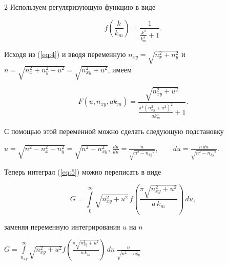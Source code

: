 \documentclass[twoside, 10pt]{article}
\def\myvspacebeforesubsection{-2.0mm}
\def\myvspaceaftersubsection{-2.5mm}
\begin{document}
\vspace{\myvspacebeforesubsection}
    \subsection*{}\label{appendix-a.-integration-details}
\vspace{\myvspaceaftersubsection}

\begin{multicols}{2}
    Используем регуляризующую функцию в виде

\setcounter{equation}{0}
\renewcommand{\theequation}{A.\arabic{equation}}

\begin{equation}
f\left(\frac{k}{k_m}\right) = \frac{1}{\frac{k^{4}}{k_{m}^{4}} + 1}.
\end{equation}


    Исходя из (\ref{eq:4}) и вводя переменную \(n_{xy} = \sqrt{n_x^2 + n_y^2}\) и \(n = \sqrt{n_x^2 + n_y^2 + u^2} = \sqrt{n_{xy}^2 + u^2}\), имеем 

\noindent
\begin{equation}
F\left(u, n_{xy}, ak_m\right) = \frac{\sqrt{n_{\mathit{xy}}^{2} + u^{2}}}{\frac{\pi^{4} {\left(n_{\mathit{xy}}^{2} + u^{2}\right)}^{2}}{\mathit{ak}_{m}^{4}} + 1}.
\end{equation}


С помощью этой переменной можно сделать следующую подстановку

\vspace{1.5mm}
\(u = \sqrt{n^2 - n_x^2 - n_y^2} = \sqrt{n^2 - n_{xy}^2}\),
\(\frac{du}{dn} = \frac{n}{\sqrt{n^{2} - \mathit{n_{xy}}^{2}}}\), $\,\,\,\,\,\,\,\,\,$
 \(d{u}= \frac{n\,d{n}}{\sqrt{n^{2} - \mathit{n_{xy}}^{2}}}\).

    Теперь интеграл (\ref{eq:5}) можно переписать в виде

\begin{equation}
G%
 = \int\limits_{0}^{\infty}\sqrt{n_{xy}^2+u^2}\,
f\left(\frac{\pi\sqrt{n_{xy}^2+u^2}}{a\,k_m}\right)\,d{u},
\end{equation}

заменяя переменную интегрирования \(u\) на \(n\)

\noindent
$G%
 = \int\limits_{n_{xy}}^{\infty}\sqrt{n_{xy}^2+u^2}
 f\left(\frac{\pi\sqrt{n_{xy}^2+u^2}}{a\,k_m}\right)\,dn\,{\frac{n}{\sqrt{n^{2} - n_{xy}^{2}}}}$


\end{multicols}
\end{document}
